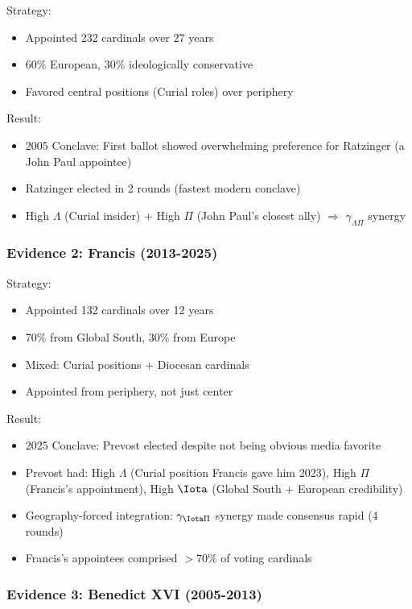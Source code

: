 \documentclass[11pt]{article}
\begin{document}
Strategy:
\begin{itemize}
\item Appointed 232 cardinals over 27 years
\item 60\% European, 30\% ideologically conservative
\item Favored central positions (Curial roles) over periphery
\end{itemize}

Result:
\begin{itemize}
\item 2005 Conclave: First ballot showed overwhelming preference for Ratzinger (a John Paul appointee)
\item Ratzinger elected in 2 rounds (fastest modern conclave)
\item High $\Lambda$ (Curial insider) + High $\Pi$ (John Paul's closest ally) $\Rightarrow$ $\gamma_{\Lambda\Pi}$ synergy
\end{itemize}

\subsubsection{Evidence 2: Francis (2013-2025)}

Strategy:
\begin{itemize}
\item Appointed 132 cardinals over 12 years
\item 70\% from Global South, 30\% from Europe
\item Mixed: Curial positions + Diocesan cardinals
\item Appointed from periphery, not just center
\end{itemize}

Result:
\begin{itemize}
\item 2025 Conclave: Prevost elected despite not being obvious media favorite
\item Prevost had: High $\Lambda$ (Curial position Francis gave him 2023), High $\Pi$ (Francis's appointment), High $\Iota$ (Global South + European credibility)
\item Geography-forced integration: $\gamma_{\Iota\Pi}$ synergy made consensus rapid (4 rounds)
\item Francis's appointees comprised $>70\%$ of voting cardinals
\end{itemize}

\subsubsection{Evidence 3: Benedict XVI (2005-2013)}
\end{document}
